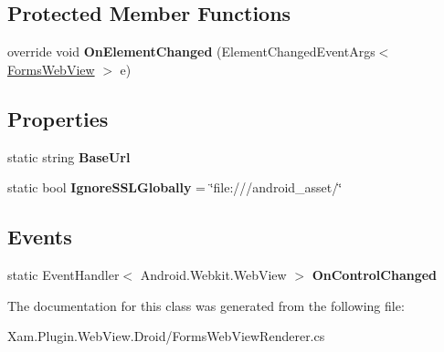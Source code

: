 \subsection*{Protected Member Functions}
\begin{DoxyCompactItemize}
\item 
\mbox{\label{class_xam_1_1_plugin_1_1_web_view_1_1_droid_1_1_forms_web_view_renderer_a472582869c6c49740c078f612f60d315}} 
override void {\bfseries On\+Element\+Changed} (Element\+Changed\+Event\+Args$<$ \hyperlink{class_xam_1_1_plugin_1_1_web_view_1_1_abstractions_1_1_forms_web_view}{Forms\+Web\+View} $>$ e)
\end{DoxyCompactItemize}
\subsection*{Properties}
\begin{DoxyCompactItemize}
\item 
\mbox{\label{class_xam_1_1_plugin_1_1_web_view_1_1_droid_1_1_forms_web_view_renderer_afc8e436623da71b6b9f8c9d443d0c5af}} 
static string {\bfseries Base\+Url}
\item 
\mbox{\label{class_xam_1_1_plugin_1_1_web_view_1_1_droid_1_1_forms_web_view_renderer_a5295233aec42a3fcb82f84c7d1d9900a}} 
static bool {\bfseries Ignore\+S\+S\+L\+Globally} = \char`\"{}file\+:///android\+\_\+asset/\char`\"{}
\end{DoxyCompactItemize}
\subsection*{Events}
\begin{DoxyCompactItemize}
\item 
\mbox{\label{class_xam_1_1_plugin_1_1_web_view_1_1_droid_1_1_forms_web_view_renderer_ab7870690cf6a393bc2b2db2741b58576}} 
static Event\+Handler$<$ Android.\+Webkit.\+Web\+View $>$ {\bfseries On\+Control\+Changed}
\end{DoxyCompactItemize}


The documentation for this class was generated from the following file\+:\begin{DoxyCompactItemize}
\item 
Xam.\+Plugin.\+Web\+View.\+Droid/Forms\+Web\+View\+Renderer.\+cs\end{DoxyCompactItemize}
